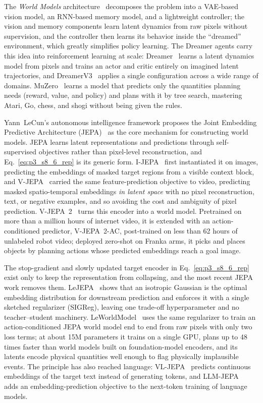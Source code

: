 The \emph{World Models} architecture~\cite{ha2018world} decomposes the problem into a VAE-based vision model, an RNN-based memory model, and a lightweight controller; the vision and memory components learn latent dynamics from raw pixels without supervision, and the controller then learns its behavior inside the ``dreamed'' environment, which greatly simplifies policy learning.
The Dreamer agents carry this idea into reinforcement learning at scale: Dreamer~\cite{hafner2019dreamer} learns a latent dynamics model from pixels and trains an actor and critic entirely on imagined latent trajectories, and DreamerV3~\cite{hafner2023mastering} applies a single configuration across a wide range of domains. MuZero~\cite{schrittwieser2020mastering} learns a model that predicts only the quantities planning needs (reward, value, and policy) and plans with it by tree search, mastering Atari, Go, chess, and shogi without being given the rules.


Yann~LeCun's autonomous intelligence framework proposes the Joint Embedding Predictive Architecture (JEPA)~\cite{lecun2022path} as the core mechanism for constructing world models.
JEPA learns latent representations and predictions through self-supervised objectives rather than pixel-level reconstruction, and Eq.~\eqref{eq:p3_s8_6_rep} is its generic form.
I-JEPA~\cite{assran2023jepa} first instantiated it on images, predicting the embeddings of masked target regions from a visible context block, and V-JEPA~\cite{bardes2024vjepa} carried the same feature-prediction objective to video, predicting masked spatio-temporal embeddings \emph{in latent space} with no pixel reconstruction, text, or negative examples, and so avoiding the cost and ambiguity of pixel prediction.
V-JEPA~2~\cite{assran2025vjepa} turns this encoder into a world model. Pretrained on more than a million hours of internet video, it is extended with an action-conditioned predictor, V-JEPA~2-AC, post-trained on less than 62 hours of unlabeled robot video; deployed zero-shot on Franka arms, it picks and places objects by planning actions whose predicted embeddings reach a goal image.

The stop-gradient and slowly updated target encoder in Eq.~\eqref{eq:p3_s8_6_rep} exist only to keep the representation from collapsing, and the most recent JEPA work removes them. LeJEPA~\cite{balestriero2025lejepa} shows that an isotropic Gaussian is the optimal embedding distribution for downstream prediction and enforces it with a single sketched regularizer (SIGReg), leaving one trade-off hyperparameter and no teacher--student machinery. LeWorldModel~\cite{maes2026leworldmodel} uses the same regularizer to train an action-conditioned JEPA world model end to end from raw pixels with only two loss terms; at about 15M parameters it trains on a single GPU, plans up to 48 times faster than world models built on foundation-model encoders, and its latents encode physical quantities well enough to flag physically implausible events.
The principle has also reached language: VL-JEPA~\cite{chen2025vl} predicts continuous embeddings of the target text instead of generating tokens, and LLM-JEPA~\cite{huang2026llmjepa} adds an embedding-prediction objective to the next-token training of language models.


